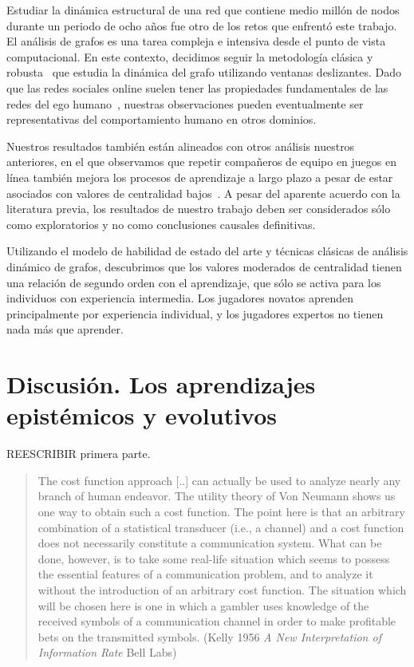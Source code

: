 \documentclass[a4paper,11pt]{book}
\theoremstyle{definition}
\begin{document}

Estudiar la din\'amica estructural de una red que contiene medio mill\'on de nodos durante un periodo de ocho a\~nos fue otro de los retos que enfrent\'o este trabajo.
%
El an\'alisis de grafos es una tarea compleja e intensiva desde el punto de vista computacional.
%
En este contexto, decidimos seguir la metodolog\'ia cl\'asica y robusta~\cite{Kossinets2006, Mcgregor2014} que estudia la din\'amica del grafo utilizando ventanas deslizantes.
%
Dado que las redes sociales online suelen tener las propiedades fundamentales de las redes del ego humano~\cite{arnaboldi2017-egoNetwork}, nuestras observaciones pueden eventualmente ser representativas del comportamiento humano en otros dominios.


Nuestros resultados tambi\'en est\'an alineados con otros an\'alisis nuestros anteriores, en el que observamos que repetir compa\~neros de equipo en juegos en l\'inea tambi\'en mejora los procesos de aprendizaje a largo plazo a pesar de estar asociados con valores de centralidad bajos~\cite{Landfried2019}.
%
A pesar del aparente acuerdo con la literatura previa, los resultados de nuestro trabajo deben ser considerados s\'olo como exploratorios y no como conclusiones causales definitivas.

%

Utilizando el modelo de habilidad de estado del arte y t\'ecnicas cl\'asicas de an\'alisis din\'amico de grafos, descubrimos que los valores moderados de centralidad tienen una relaci\'on de segundo orden con el aprendizaje, que s\'olo se activa para los individuos con experiencia intermedia.
Los jugadores novatos aprenden principalmente por experiencia individual, y los jugadores expertos no tienen nada m\'as que aprender.







\chapter{Discusi\'on. Los aprendizajes epist\'emicos y evolutivos}\label{ch:epistemico}

REESCRIBIR primera parte.

\begin{quotation}
The cost function approach [..] can actually be used to analyze nearly any branch of human endeavor.
The utility theory of Von Neumann shows us one way to obtain such a cost function.
The point here is that an arbitrary combination of a statistical transducer (i.e., a channel) and a cost function does not necessarily constitute a communication system.
What can be done, however, is to take some real-life situation which seems to possess the essential features of a communication problem, and to analyze it without the introduction of an arbitrary cost function.
The situation which will be chosen here is one in which a gambler uses knowledge of the received symbols of a communication channel in order to make profitable bets on the transmitted symbols. (Kelly 1956 \emph{A New Interpretation of Information Rate} Bell Labs)
\end{quotation}
\end{document}
